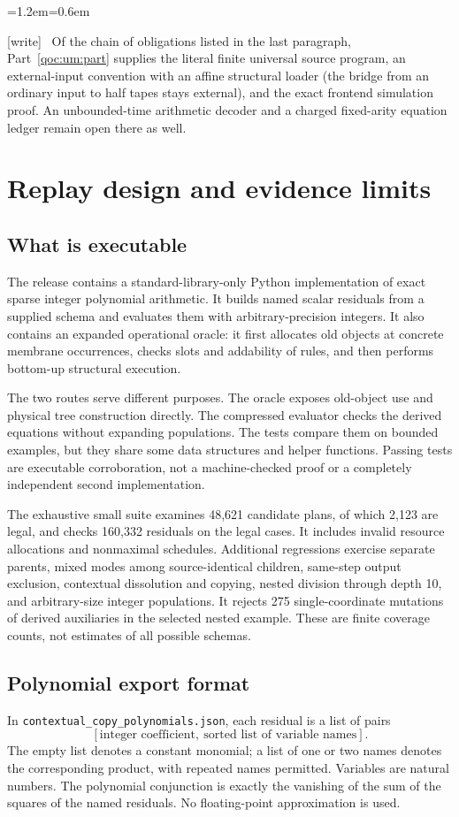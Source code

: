 \documentclass[11pt,letterpaper]{article}
\theoremstyle{definition}
\theoremstyle{remark}
\newcommand{\file}[1]{\nolinkurl{#1}}
\newcommand{\wtag}{\textup{[write]}}
\newenvironment{writenote}{\par\smallskip\begin{list}{}{\leftmargin=1.2em\rightmargin=0.6em}\item[]\small\wtag\ }{\end{list}\smallskip}
\begin{document}
\begin{writenote}
Of the chain of obligations listed in the last paragraph, Part~\ref{qoc:um:part} supplies the literal finite universal source program, an external-input convention with an affine structural loader (the bridge from an ordinary input to half tapes stays external), and the exact frontend simulation proof. An unbounded-time arithmetic decoder and a charged fixed-arity equation ledger remain open there as well.
\end{writenote}


\section{Replay design and evidence limits}\label{qoc:mm:sec:replay}
\subsection{What is executable}
The release contains a standard-library-only Python implementation of exact sparse integer polynomial arithmetic. It builds named scalar residuals from a supplied schema and evaluates them with arbitrary-precision integers. It also contains an expanded operational oracle: it first allocates old objects at concrete membrane occurrences, checks slots and addability of rules, and then performs bottom-up structural execution.

The two routes serve different purposes. The oracle exposes old-object use and physical tree construction directly. The compressed evaluator checks the derived equations without expanding populations. The tests compare them on bounded examples, but they share some data structures and helper functions. Passing tests are executable corroboration, not a machine-checked proof or a completely independent second implementation.

The exhaustive small suite examines 48,621 candidate plans, of which 2,123 are legal, and checks 160,332 residuals on the legal cases. It includes invalid resource allocations and nonmaximal schedules. Additional regressions exercise separate parents, mixed modes among source-identical children, same-step output exclusion, contextual dissolution and copying, nested division through depth 10, and arbitrary-size integer populations. It rejects 275 single-coordinate mutations of derived auxiliaries in the selected nested example. These are finite coverage counts, not estimates of all possible schemas.

\subsection{Polynomial export format}
In \file{contextual_copy_polynomials.json}, each residual is a list of pairs
\[
 [\text{integer coefficient},\ \text{sorted list of variable names}].
\]
The empty list denotes a constant monomial; a list of one or two names denotes the corresponding product, with repeated names permitted. Variables are natural numbers. The polynomial conjunction is exactly the vanishing of the sum of the squares of the named residuals. No floating-point approximation is used.
\end{document}
